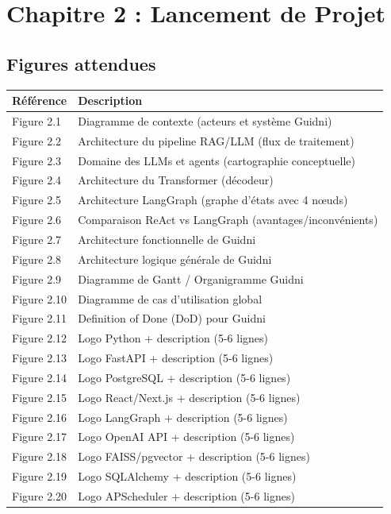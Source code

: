 \documentclass[12pt,a4paper]{article}
\begin{document}
\section{Chapitre 2 : Lancement de Projet}

\subsection*{Figures attendues}

\begin{longtable}{p{2cm} p{12cm}}
    \textbf{Référence} & \textbf{Description} \\
    \midrule
    \endhead
    
    Figure 2.1 & Diagramme de contexte (acteurs et système Guidni) \\
    Figure 2.2 & Architecture du pipeline RAG/LLM (flux de traitement) \\
    Figure 2.3 & Domaine des LLMs et agents (cartographie conceptuelle) \\
    Figure 2.4 & Architecture du Transformer (décodeur) \\
    Figure 2.5 & Architecture LangGraph (graphe d'états avec 4 nœuds) \\
    Figure 2.6 & Comparaison ReAct vs LangGraph (avantages/inconvénients) \\
    Figure 2.7 & Architecture fonctionnelle de Guidni \\
    Figure 2.8 & Architecture logique générale de Guidni \\
    Figure 2.9 & Diagramme de Gantt / Organigramme Guidni \\
    Figure 2.10 & Diagramme de cas d'utilisation global \\
    Figure 2.11 & Definition of Done (DoD) pour Guidni \\
    Figure 2.12 & Logo Python + description (5-6 lignes) \\
    Figure 2.13 & Logo FastAPI + description (5-6 lignes) \\
    Figure 2.14 & Logo PostgreSQL + description (5-6 lignes) \\
    Figure 2.15 & Logo React/Next.js + description (5-6 lignes) \\
    Figure 2.16 & Logo LangGraph + description (5-6 lignes) \\
    Figure 2.17 & Logo OpenAI API + description (5-6 lignes) \\
    Figure 2.18 & Logo FAISS/pgvector + description (5-6 lignes) \\
    Figure 2.19 & Logo SQLAlchemy + description (5-6 lignes) \\
    Figure 2.20 & Logo APScheduler + description (5-6 lignes) \\
    \bottomrule
\end{longtable}
\end{document}
